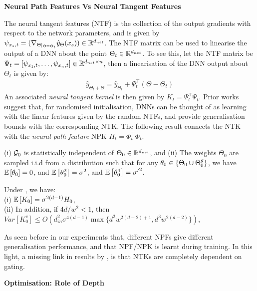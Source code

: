 \begin{center}
\textbf{Neural Path Features Vs Neural Tangent Features}
\end{center}
The neural tangent features (NTF) is the collection of the output gradients with respect to the network parameters, and is given by $\psi_{x_s,t}=(\nabla_{\Theta|_{\Theta=\Theta_t}} \hat{y}_{\Theta}(x_s))\in\mathbb{R}^{d_{net}}$.  The NTF matrix can be used to linearise the output of a DNN about the point $\Theta_t\in\mathbb{R}^{d_{net}}$. To see this, let the NTF matrix be $\Psi_t=[\psi_{x_1,t},\ldots, \psi_{x_n,t}]\in\mathbb{R}^{d_{net}\times n}$, then a linearisation of the DNN output about $\Theta_t$ is given by:
\begin{align}
\hat{y}_{\Theta_t+\Theta}=\hat{y}_{\Theta_t} + \Psi^\top_t (\Theta-\Theta_t)
\end{align}
An associated \emph{neural tangent kernel} is then given by $K_t=\Psi^\top_t\Psi_t$. Prior works \cite{arora,arora2019exact,cao2019generalization} suggest that, for randomised initialisation, DNNs can be thought of as learning with the linear features given by the random NTFs, and provide generalisation bounds with the corresponding NTK. The following result  connects the NTK with the \emph{neural path feature }NPK $H_t=\Phi^\top_t\Phi_t$.
\begin{assumption}\label{assmp:main}
(i) $\mathcal{G}_0$ is statistically independent of $\Theta_0\in\mathbb{R}^{d_{net}}$, and (ii) The weights $\Theta_0$ are sampled i.i.d from a distribution such that for any $\theta_0\in\{\Theta_0\cup {\Theta}^g_0\}$,  we have $\mathbb{E}\left[\theta_0\right]=0$, and  $\mathbb{E}\left[\theta^2_0\right]=\sigma^2$, and $\mathbb{E}\left[\theta^4_0\right]={\sigma'}^2$.
\end{assumption}
\begin{theorem}\label{th:main} Under , we have:\\
(i) $\mathbb{E}\left[K_0\right]=\sigma^{2(d-1)}H_0$,\\
(ii) In addition, if ${4d}/{w^2}<1$, then $Var\left[K^v_0\right]\leq O\left(d^2_{in}\sigma^{4(d-1)}\max\{d^2w^{2(d-2)+1}, d^3w^{2(d-2)}\}\right)$,\\
\end{theorem}
As seen before in our experiments that, different NPFs give different generalisation performance, and that NPF/NPK is learnt during training. In this light, a missing link in results by \cite{arora2019exact,cao2019generalization}, is that NTKs are completely dependent on gating.
\begin{center}
\textbf{Optimisation: Role of Depth}
\end{center}
